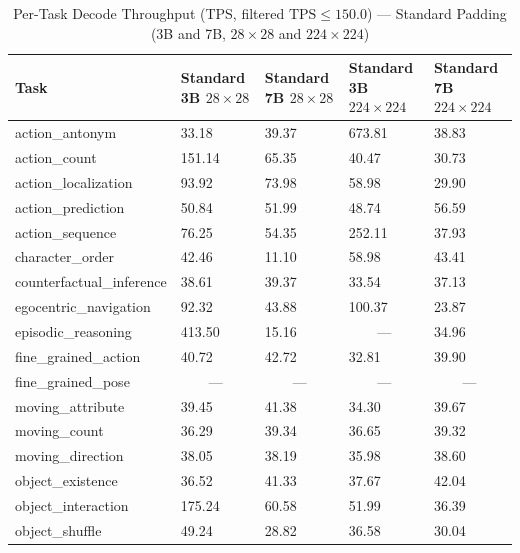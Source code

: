 \documentclass[conference]{IEEEtran}
\begin{document}
\begin{table}[!t]
  \centering
  \def\arraystretch{1.18}
  \caption{Per-Task Decode Throughput (TPS, filtered $\text{TPS} \leq 150.0$) --- Standard Padding (3B and 7B, $28{\times}28$ and $224{\times}224$)}
  \label{tab:standard_tps}
  \begin{tabularx}{\textwidth}{>{\raggedright\arraybackslash}p{4.5cm} YYYY}
    \toprule
    \textbf{Task}
      & \textbf{Standard 3B $28{\times}28$}
      & \textbf{Standard 7B $28{\times}28$}
      & \textbf{Standard 3B $224{\times}224$}
      & \textbf{Standard 7B $224{\times}224$} \\
    \midrule
    action\_antonym            & 33.18  & 39.37 & 673.81 & 38.83 \\
    action\_count              & 151.14 & 65.35 & 40.47  & 30.73 \\
    action\_localization       & 93.92  & 73.98 & 58.98  & 29.90 \\
    action\_prediction         & 50.84  & 51.99 & 48.74  & 56.59 \\
    action\_sequence           & 76.25  & 54.35 & 252.11 & 37.93 \\
    \addlinespace
    character\_order           & 42.46  & 11.10 & 58.98  & 43.41 \\
    counterfactual\_inference  & 38.61  & 39.37 & 33.54  & 37.13 \\
    egocentric\_navigation     & 92.32  & 43.88 & 100.37 & 23.87 \\
    episodic\_reasoning        & 413.50 & 15.16 &  & 34.96 \\
    fine\_grained\_action      & 40.72  & 42.72 & 32.81  & 39.90 \\
    \addlinespace
    fine\_grained\_pose        &  &  &  &  \\
    moving\_attribute          & 39.45  & 41.38 & 34.30  & 39.67 \\
    moving\_count              & 36.29  & 39.34 & 36.65  & 39.32 \\
    moving\_direction          & 38.05  & 38.19 & 35.98  & 38.60 \\
    object\_existence          & 36.52  & 41.33 & 37.67  & 42.04 \\
    \addlinespace
    object\_interaction        & 175.24 & 60.58 & 51.99  & 36.39 \\
    object\_shuffle            & 49.24  & 28.82 & 36.58  & 30.04 \\

\end{tabularx}
\end{table}
\end{document}
